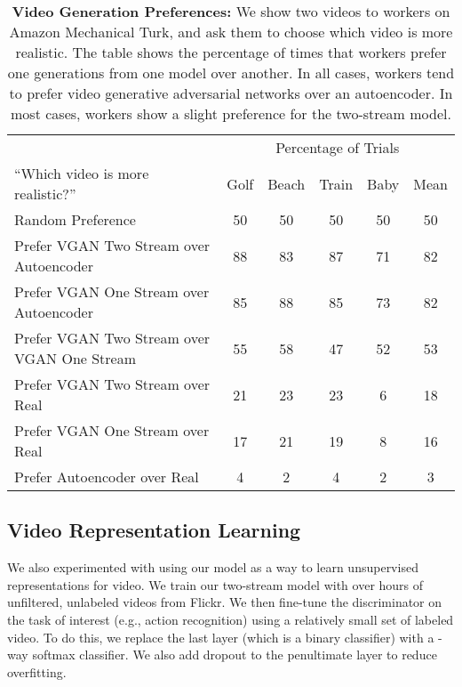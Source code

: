 \documentclass{article}
\begin{document}
\begin{table}
\centering
\begin{tabular}{l | c c c c | c }
& \multicolumn{5}{|c}{Percentage of Trials} \\
``Which video is more realistic?'' & Golf & Beach & Train & Baby & Mean \\
\hline
Random Preference                           & 50 & 50 & 50 & 50 & 50 \\
Prefer VGAN Two Stream over Autoencoder     & 88 & 83 & 87 & 71 & 82 \\
Prefer VGAN One Stream over Autoencoder     & 85 & 88 & 85 & 73 & 82 \\
Prefer VGAN Two Stream over VGAN One Stream & 55 & 58 & 47 & 52 & 53 \\
\hline
Prefer VGAN Two Stream over Real            & 21 & 23 & 23 & 6 & 18 \\
Prefer VGAN One Stream over Real            & 17 & 21 & 19 & 8 & 16 \\
Prefer Autoencoder over Real                & 4  & 2  & 4    & 2 & 3 \\
\end{tabular}
\caption{\textbf{Video Generation Preferences:} We show two videos to workers on Amazon Mechanical Turk, and ask them to choose which video is more realistic. The table shows the percentage of times that workers prefer one generations from one model over another. In all cases, workers tend to prefer video generative adversarial networks over an autoencoder. In most cases, workers show a slight preference for the two-stream model.}
\label{tab:results}
\vspace{-2em}
\end{table}

\subsection{Video Representation Learning}

We also experimented with using our model as a way to learn unsupervised representations for video. We train our two-stream model with over  hours of unfiltered, unlabeled videos from Flickr. We then fine-tune the discriminator on the task of interest (e.g., action recognition) using a relatively small set of labeled video. To do this, we replace the last layer (which is a binary classifier) with a -way softmax classifier. We also add dropout \cite{srivastava2014dropout} to the penultimate layer to reduce overfitting.
\end{document}
